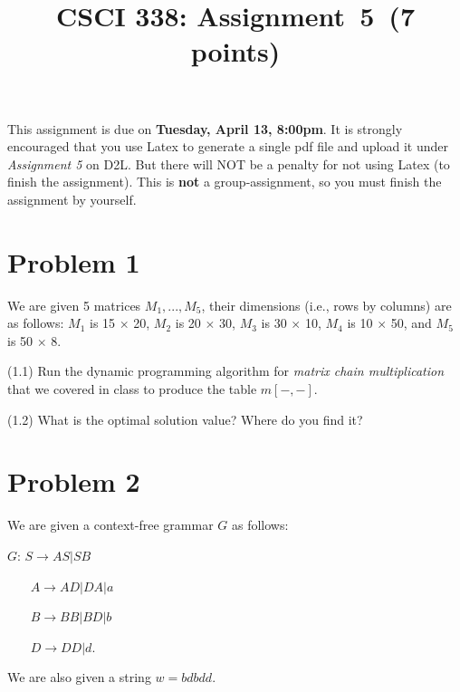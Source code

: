 \documentclass[11pt]{article}
\begin{document}
\date{}

\title{CSCI 338: Assignment~5~(7 points)}



\maketitle

\noindent
This assignment is due on {\bf Tuesday, April 13, 8:00pm}. It is strongly
encouraged that you use Latex to generate a single pdf file and upload it
under {\em Assignment 5} on D2L. But there will NOT be a penalty for not
using Latex (to finish the assignment). This is {\bf not} a group-assignment,
so you must finish the assignment by yourself.

\section*{Problem 1}

\noindent
We are given 5 matrices $M_1,...,M_5$, their dimensions (i.e., rows by columns)
are as follows: 
$M_1$ is 15 $\times$ 20,
$M_2$ is 20 $\times$ 30,
$M_3$ is 30 $\times$ 10,
$M_4$ is 10 $\times$ 50, and
$M_5$ is 50 $\times$ 8.
\newline

\noindent
(1.1) Run the dynamic programming algorithm for {\em matrix chain multiplication} that we covered in class to produce the table $m[-,-]$.
\newline

\noindent
(1.2) What is the optimal solution value? Where do you find it? 
\newline
\newpage

\section*{Problem 2}

\noindent
We are given a context-free grammar $G$ as follows:
\newline

$G$: $S\rightarrow AS|SB$

~~~  $A\rightarrow AD|DA|a$

~~~  $B\rightarrow BB|BD|b$

~~~  $D\rightarrow DD|d$.

We are also given a string $w=bdbdd$.
\newline
\end{document}
